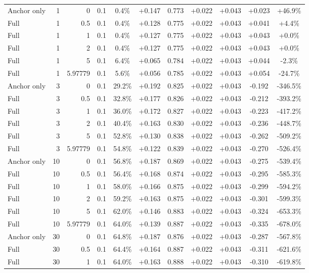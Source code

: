 \begin{table}[htbp]
\begin{tabular}{lrrrccccccc}
Anchor only & 1 & 0 & 0.1 & 0.4\% & +0.147 & 0.773 & +0.022 & +0.043 & +0.023 & +46.9\% \\
Full & 1 & 0.5 & 0.1 & 0.4\% & +0.128 & 0.775 & +0.022 & +0.043 & +0.041 & +4.4\% \\
Full & 1 & 1 & 0.1 & 0.4\% & +0.127 & 0.775 & +0.022 & +0.043 & +0.043 & +0.0\% \\
Full & 1 & 2 & 0.1 & 0.4\% & +0.127 & 0.775 & +0.022 & +0.043 & +0.043 & +0.0\% \\
Full & 1 & 5 & 0.1 & 6.4\% & +0.065 & 0.784 & +0.022 & +0.043 & +0.044 & -2.3\% \\
Full & 1 & 5.97779 & 0.1 & 5.6\% & +0.056 & 0.785 & +0.022 & +0.043 & +0.054 & -24.7\% \\
Anchor only & 3 & 0 & 0.1 & 29.2\% & +0.192 & 0.825 & +0.022 & +0.043 & -0.192 & -346.5\% \\
Full & 3 & 0.5 & 0.1 & 32.8\% & +0.177 & 0.826 & +0.022 & +0.043 & -0.212 & -393.2\% \\
Full & 3 & 1 & 0.1 & 36.0\% & +0.172 & 0.827 & +0.022 & +0.043 & -0.223 & -417.2\% \\
Full & 3 & 2 & 0.1 & 40.4\% & +0.163 & 0.830 & +0.022 & +0.043 & -0.236 & -448.7\% \\
Full & 3 & 5 & 0.1 & 52.8\% & +0.130 & 0.838 & +0.022 & +0.043 & -0.262 & -509.2\% \\
Full & 3 & 5.97779 & 0.1 & 54.8\% & +0.122 & 0.839 & +0.022 & +0.043 & -0.270 & -526.4\% \\
Anchor only & 10 & 0 & 0.1 & 56.8\% & +0.187 & 0.869 & +0.022 & +0.043 & -0.275 & -539.4\% \\
Full & 10 & 0.5 & 0.1 & 56.4\% & +0.168 & 0.874 & +0.022 & +0.043 & -0.295 & -585.3\% \\
Full & 10 & 1 & 0.1 & 58.0\% & +0.166 & 0.875 & +0.022 & +0.043 & -0.299 & -594.2\% \\
Full & 10 & 2 & 0.1 & 59.2\% & +0.163 & 0.875 & +0.022 & +0.043 & -0.301 & -599.3\% \\
Full & 10 & 5 & 0.1 & 62.0\% & +0.146 & 0.883 & +0.022 & +0.043 & -0.324 & -653.3\% \\
Full & 10 & 5.97779 & 0.1 & 64.0\% & +0.139 & 0.887 & +0.022 & +0.043 & -0.335 & -678.0\% \\
Anchor only & 30 & 0 & 0.1 & 64.8\% & +0.187 & 0.876 & +0.022 & +0.043 & -0.287 & -567.8\% \\
Full & 30 & 0.5 & 0.1 & 64.4\% & +0.164 & 0.887 & +0.022 & +0.043 & -0.311 & -621.6\% \\
Full & 30 & 1 & 0.1 & 64.0\% & +0.163 & 0.888 & +0.022 & +0.043 & -0.310 & -619.8\% \\

\end{tabular}
\end{table}
